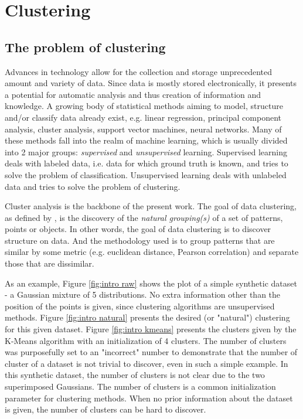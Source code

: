 
\chapter{Clustering}
\label{chapter:clustering}

\section{The problem of clustering}
\label{sec:clustering}

Advances in technology allow for the collection and storage unprecedented amount and variety of data.
Since data is mostly stored electronically, it presents a potential for automatic analysis and thus creation of information and knowledge.
A growing body of statistical methods aiming to model, structure and/or classify data already exist, e.g. linear regression, principal component analysis, cluster analysis, support vector machines, neural networks.
Many of these methods fall into the realm of machine learning, which is usually divided into 2 major groups: \textit{supervised} and \textit{unsupervised} learning.
Supervised learning deals with labeled data, i.e. data for which ground truth is known, and tries to solve the problem of classification. %
Unsupervised learning deals with unlabeled data and tries to solve the problem of clustering. %

Cluster analysis is the backbone of the present work.
The goal of data clustering, as defined by \cite{Jain2010}, is the discovery of the \textit{natural grouping(s)} of a set of patterns, points or objects.
In other words, the goal of data clustering is to discover structure on data.
And the methodology used is to group patterns that are similar by some metric (e.g. euclidean distance, Pearson correlation) and separate those that are dissimilar. %

As an example, Figure \ref{fig:intro raw} shows the plot of a simple synthetic dataset - a Gaussian mixture of 5 distributions.
No extra information other than the position of the points is given, since clustering algorithms are unsupervised methods.
Figure \ref{fig:intro natural} presents the desired (or "natural") clustering for this given dataset.
Figure \ref{fig:intro kmeans} presents the clusters given by the K-Means algorithm with an initialization of 4 clusters.
The number of clusters was purposefully set to an "incorrect" number to demonstrate that the number of cluster of a dataset is not trivial to discover, even in such a simple example.
In this synthetic dataset, the number of clusters is not clear due to the two superimposed Gaussians.
The number of clusters is a common initialization parameter for clustering methods.
When no prior information about the dataset is given, the number of clusters can be hard to discover.

